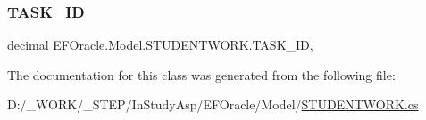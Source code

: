 \subsubsection{\texorpdfstring{T\+A\+S\+K\+\_\+\+ID}{TASK\_ID}}
{\footnotesize\ttfamily decimal E\+F\+Oracle.\+Model.\+S\+T\+U\+D\+E\+N\+T\+W\+O\+R\+K.\+T\+A\+S\+K\+\_\+\+ID\hspace{0.3cm}{\ttfamily [get]}, {\ttfamily [set]}}



The documentation for this class was generated from the following file\+:\begin{DoxyCompactItemize}
\item 
D\+:/\+\_\+\+W\+O\+R\+K/\+\_\+\+S\+T\+E\+P/\+In\+Study\+Asp/\+E\+F\+Oracle/\+Model/\hyperlink{_s_t_u_d_e_n_t_w_o_r_k_8cs}{S\+T\+U\+D\+E\+N\+T\+W\+O\+R\+K.\+cs}\end{DoxyCompactItemize}
